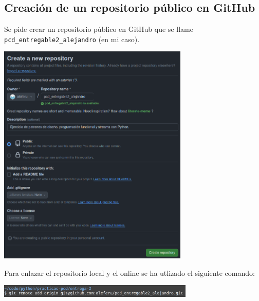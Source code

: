 \subsection{Creación de un repositorio público en GitHub}

Se pide crear un repositorio público en GitHub que se llame \texttt{pcd\_entregable2\_alejandro} (en mi caso).

\begin{center}
    \includegraphics[width=0.68\textwidth]{img/creacion-repositorio-online.png}
\end{center}

Para enlazar el repositorio local y el online se ha utlizado el siguiente comando:

\begin{center}
    \includegraphics[width=0.7\textwidth]{img/repositorio-local-origin.png}
\end{center}
